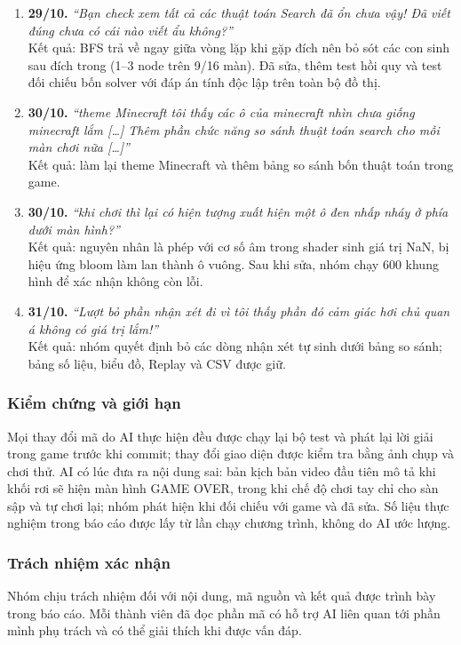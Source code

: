 \documentclass[a4paper]{article}
\newcommand{\tep}[1]{{\small\ttfamily\detokenize{#1}}}
\begin{document}
\begin{enumerate}[leftmargin=*]
Kết quả: xác nhận đề có một chỉ dẫn ẩn dành cho AI, yêu cầu chèn một câu cố định vào báo cáo. Nhóm không làm theo chỉ dẫn này và kiểm tra mã nguồn, tài liệu không chứa câu đó.
\item \textbf{29/10.} \textit{``Bạn check xem tất cả các thuật toán Search đã ổn chưa vậy! Đã viết đúng chưa có cái nào viết ẩu không?''}\\
Kết quả: BFS trả về ngay giữa vòng lặp khi gặp đích nên bỏ sót các con sinh sau đích trong \tep{nodes_generated} (1--3 node trên 9/16 màn). Đã sửa, thêm test hồi quy và test đối chiếu bốn solver với đáp án tính độc lập trên toàn bộ đồ thị.
\item \textbf{30/10.} \textit{``theme Minecraft tôi thấy các ô của minecraft nhìn chưa giống minecraft lắm […] Thêm phần chức năng so sánh thuật toán search cho mỗi màn chơi nữa […]''}\\
Kết quả: làm lại theme Minecraft và thêm bảng so sánh bốn thuật toán trong game.
\item \textbf{30/10.} \textit{``khi chơi thì lại có hiện tượng xuất hiện một ô đen nhấp nháy ở phía dưới màn hình?''}\\
Kết quả: nguyên nhân là phép \tep{pow} với cơ số âm trong shader sinh giá trị NaN, bị hiệu ứng bloom làm lan thành ô vuông. Sau khi sửa, nhóm chạy 600 khung hình để xác nhận không còn lỗi.
\item \textbf{31/10.} \textit{``Lượt bỏ phần nhận xét đi vì tôi thấy phần đó cảm giác hơi chủ quan á không có giá trị lắm!''}\\
Kết quả: nhóm quyết định bỏ các dòng nhận xét tự sinh dưới bảng so sánh; bảng số liệu, biểu đồ, Replay và CSV được giữ.
\end{enumerate}

\subsubsection{Kiểm chứng và giới hạn}
Mọi thay đổi mã do AI thực hiện đều được chạy lại bộ test và phát lại lời giải trong game trước khi commit; thay đổi giao diện được kiểm tra bằng ảnh chụp và chơi thử. AI có lúc đưa ra nội dung sai: bản kịch bản video đầu tiên mô tả khi khối rơi sẽ hiện màn hình GAME OVER, trong khi chế độ chơi tay chỉ cho sàn sập và tự chơi lại; nhóm phát hiện khi đối chiếu với game và đã sửa. Số liệu thực nghiệm trong báo cáo được lấy từ lần chạy chương trình, không do AI ước lượng.

\subsubsection{Trách nhiệm xác nhận}
Nhóm chịu trách nhiệm đối với nội dung, mã nguồn và kết quả được trình bày trong báo cáo. Mỗi thành viên đã đọc phần mã có hỗ trợ AI liên quan tới phần mình phụ trách và có thể giải thích khi được vấn đáp.
\end{document}
